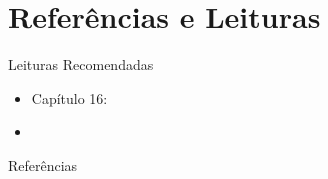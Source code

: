 \documentclass[aspectratio=169,xcolor=dvipsnames]{beamer}
\begin{document}
  \section*{Referências e Leituras}

  \begin{frame}{Leituras Recomendadas}
    \leiturasize
    \begin{itemize}
      \item Capítulo 16: 
      \item {}
    \end{itemize}
  \end{frame}

  \begin{frame}[allowframebreaks]{Referências}
    \sloppy
    \printbibliography[heading=none]
  \end{frame}
\end{document}
